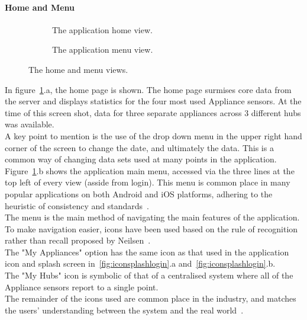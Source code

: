 \documentclass[draft,preprint,12pt,3p]{elsarticle}
\begin{document}
\paragraph{Home and Menu}
\begin{figure}[H]
    \centering
    \begin{subfigure}[t]{0.32\columnwidth}
        \centering
        \caption{The application home view.}
    \end{subfigure}
    \begin{subfigure}[t]{0.32\columnwidth}
        \centering
        \caption{The application menu view.}
    \end{subfigure}
    \caption{The home and menu views.}
    \label{fig:homemenu}
\end{figure}
In figure~\ref{fig:homemenu}.a, the home page is shown. The home page surmises core data from the server and displays statistics for the four most used Appliance sensors. At the time of this screen shot, data for three separate appliances across 3 different hubs was available.\\
A key point to mention is the use of the drop down menu in the upper right hand corner of the screen to change the date, and ultimately the data. This is a common way of changing data sets used at many points in the application.\\
Figure~\ref{fig:homemenu}.b shows the application main menu, accessed via the three lines at the top left of every view (asside from login). This menu is common place in many popular applications on both Android and iOS platforms, adhering to the heuristic of consistency and standards~\cite{nielsen}.\\
The menu is the main method of navigating the main features of the application. To make navigation easier, icons have been used based on the rule of recognition rather than recall proposed by Neilsen~\cite{nielsen}.\\
The "My Appliances" option has the same icon as that used in the application icon and splash screen in~\ref{fig:iconsplashlogin}.a and~\ref{fig:iconsplashlogin}.b.\\ 
The "My Hubs" icon is symbolic of that of a centralised system where all of the Appliance sensors report to a single point.\\ 
The remainder of the icons used are common place in the industry, and matches the users' understanding between the system and the real world~\cite{nielsen}.
\end{document}

